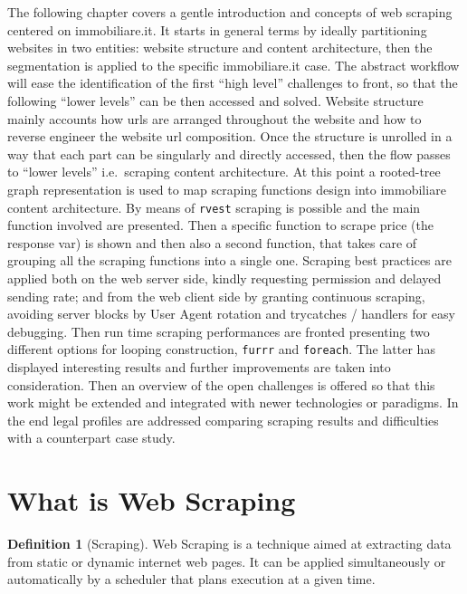 \documentclass[
  12pt,
  a4paper,
  oneside]{book}
\theoremstyle{definition}
\newtheorem{definition}{Definition}[chapter]
\theoremstyle{definition}
\theoremstyle{definition}
\theoremstyle{remark}
\begin{document}
The following chapter covers a gentle introduction and concepts of web scraping centered on immobiliare.it. It starts in general terms by ideally partitioning websites in two entities: website structure and content architecture, then the segmentation is applied to the specific immobiliare.it case. The abstract workflow will ease the identification of the first ``high level'' challenges to front, so that the following ``lower levels'' can be then accessed and solved. Website structure mainly accounts how urls are arranged throughout the website and how to reverse engineer the website url composition. Once the structure is unrolled in a way that each part can be singularly and directly accessed, then the flow passes to ``lower levels'' i.e.~scraping content architecture. At this point a rooted-tree graph representation is used to map scraping functions design into immobiliare content architecture. By means of \texttt{rvest} scraping is possible and the main function involved are presented. Then a specific function to scrape price (the response var) is shown and then also a second function, that takes care of grouping all the scraping functions into a single one. Scraping best practices are applied both on the web server side, kindly requesting permission and delayed sending rate; and from the web client side by granting continuous scraping, avoiding server blocks by User Agent rotation and trycatches / handlers for easy debugging. Then run time scraping performances are fronted presenting two different options for looping construction, \texttt{furrr} and \texttt{foreach}. The latter has displayed interesting results and further improvements are taken into consideration. Then an overview of the open challenges is offered so that this work might be extended and integrated with newer technologies or paradigms. In the end legal profiles are addressed comparing scraping results and difficulties with a counterpart case study.

\hypertarget{what-is-web-scraping}{%
\section{What is Web Scraping}\label{what-is-web-scraping}}

\begin{definition}[Scraping]
\protect\hypertarget{def:scraping}{}{\label{def:scraping} {} }Web Scraping is a technique aimed at extracting data from static or dynamic internet web pages. It can be applied simultaneously or automatically by a scheduler that plans execution at a given time.
\end{definition}
\end{document}
